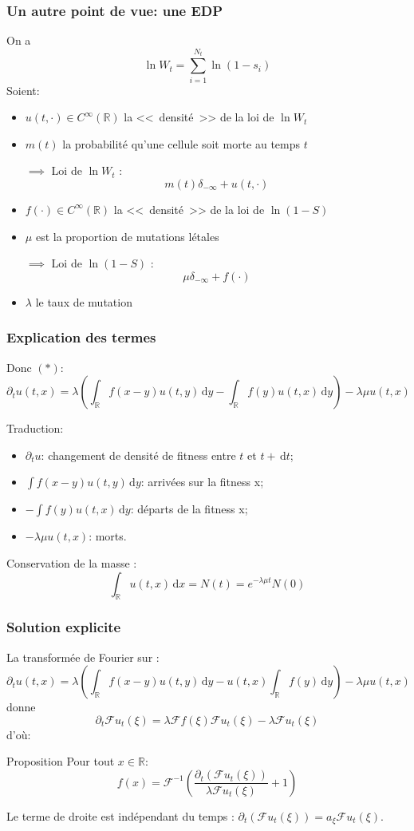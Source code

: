 \documentclass{beamer}
\newcommand{\prop}[1]{\begin{block}{Proposition}#1\end{block}}
\newcommand{\pth}[1]{\left(#1\right)}
\newcommand{\de}{\,\text{d}}
\newcommand{\Er}{\mathbb{R}}
\newcommand{\dr}{\partial}
\newcommand{\fr}{\mathcal{F}}
\begin{document}
\begin{frame}
  \frametitle{Un autre point de vue: une EDP}

  On a \[\ln W_t=\sum_{i=1}^{N_t}\ln(1-s_i)\]
  Soient:
\begin{itemize}[label=$\bullet$]
\item $u(t,\cdot)\in C^{\infty}(\Er)$ la <<~densité~>> de la loi de $\ln W_t$
\item $m(t)$ la probabilité qu'une cellule soit morte au temps $t$

$\implies$ Loi de $\ln W_t$ :
\[\label{def_u} m(t)\delta_{-\infty}+u(t,\cdot)\]
\pause
\item $f(\cdot)\in C^{\infty}(\Er)$ la <<~densité~>> de la loi de $\ln(1-S)$
\item $\mu$ est la proportion de mutations létales

$\implies$ Loi de $\ln (1-S)$ :
\[\mu\delta_{-\infty}+f(\cdot)\]
\pause
\item $\lambda$ le taux de mutation
\end{itemize}

\end{frame}
\begin{frame}
  \frametitle{Explication des termes}

Donc $(*)$:
\[\dr_tu(t,x)=\lambda\pth{\int_{\Er}f(x-y)u(t,y)\de y-\int_{\Er}f(y)u(t,x)\de y}-\lambda\mu u(t,x)\]

\vspace{0.5cm}

Traduction:
\begin{itemize}[label=$\bullet$]
\item $\dr_tu$: changement de densité de fitness entre $t$ et $t+\de t$;
\item $\int f(x-y)u(t,y)\de y$: arrivées sur la fitness x;
\item $-\int f(y)u(t,x)\de y$: départs de la fitness x;
\item $-\lambda\mu u(t,x)$: morts.
\end{itemize} 

\vspace{0.5cm}\pause

Conservation de la masse : $$\int_{\Er} u(t,x)\de x=N(t)=e^{-\lambda\mu t}N(0)$$

\end{frame}


\begin{frame}
  \frametitle{Solution explicite}
  La transformée de Fourier sur :
  \[\dr_tu(t,x)=\lambda\pth{\int_{\Er}f(x-y)u(t,y)\de y-u(t,x)\int_{\Er}f(y)\de y}-\lambda\mu u(t,x)\]
  donne
  \[\dr_t\fr u_t(\xi)=\lambda \fr f(\xi)\fr u_t(\xi)-\lambda\fr u_t(\xi)\]
  \pause
  d'où:
\prop{
    Pour tout $x\in\mathbb{R}$:
    \[f(x)=\fr^{-1}\pth{\frac{\dr_t\pth{\fr u_t(\xi)}}{\lambda\fr u_t(\xi)}+1}\]%
}
\pause
Le terme de droite est indépendant du temps : $\dr_t(\fr u_t(\xi))=a_{\xi}\fr u_t(\xi)$.

\end{frame}
\end{document}
